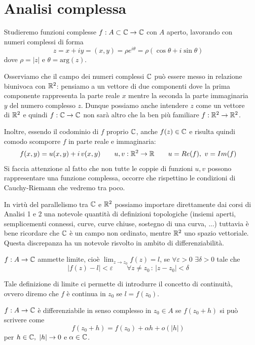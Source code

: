 
\chapter{Analisi complessa}

Studieremo funzioni complesse $f : A\subset\mathbb{C}\rightarrow \mathbb{C}$ con $A$ aperto, lavorando con numeri complessi di forma
\begin{equation*}
z = x + iy = (x, y) = \rho e^{i\theta} = \rho (\cos\theta + i\sin\theta)
\end{equation*}
dove $\rho=|z|$ e $\theta=\text{arg}(z)$.

Osserviamo che il campo dei numeri complessi $\mathbb{C}$ può essere messo in relazione
biunivoca con $\mathbb{R}^2$: pensiamo a un vettore di due componenti dove la prima componente rappresenta la parte
reale $x$ mentre la seconda la parte immaginaria $y$ del numero complesso $z$. Dunque possiamo anche intendere $z$ come un vettore di $\mathbb{R}^2$ e quindi $f:\mathbb{C}\to\mathbb{C}$ non sarà altro che la ben più familiare $f:\mathbb{R}^2\to\mathbb{R}^2$.

Inoltre, essendo il codominio di $f$ proprio $\mathbb{C}$, anche $f(z)\in\mathbb{C}$ e risulta quindi comodo scomporre $f$ in parte reale e immaginaria:
$$
f(x,y)=u(x,y)+i\,v(x,y)\qquad u,v:\mathbb{R}^2\to\mathbb{R} \qquad u=Re(f),\ v=Im(f)
$$
Si faccia attenzione al fatto che non tutte le coppie di funzioni $u,v$ possono rappresentare una funzione
complessa, occorre che rispettino le condizioni di Cauchy-Riemann che vedremo tra poco.

In virtù del parallelismo tra $\mathbb{C}$ e $\mathbb{R}^2$ possiamo importare direttamente dai corsi di Analisi 1 e 2 una notevole quantità di definizioni topologiche (insiemi aperti, semplicementi connessi, curve, curve chiuse, sostegno di una curva, ...) tuttavia è bene ricordare che $\mathbb{C}$ è un campo non ordinato, mentre $\mathbb{R}^2$ uno spazio vettoriale. Questa discrepanza ha un notevole risvolto in ambito di differenziabilità.

\begin{defn}
$f:A\to\mathbb{C}$ ammette limite, cioè $\lim_{z\to z_0}f(z)=l$, se $\forall \varepsilon>0$ $\exists\delta>0$ tale che 
$$|f(z)-l|<\varepsilon \qquad \forall z\neq z_0\,:\,|z-z_0|<\delta$$ 
\end{defn}

Tale definizione di limite ci permette di introdurre il concetto di continuità, ovvero diremo che $f$ è continua in $z_0$ se $l=f(z_0)$.

\begin{defn}
$f:A\to\mathbb{C}$ è differenziabile in senso complesso in $z_0\in A$ se $f(z_0 + h)$ si può scrivere come
\begin{equation*}
f(z_0 + h) = f(z_0) + \alpha h + o(|h|)
\end{equation*}
per $h\in\mathbb{C},\ |h|\rightarrow 0$ e $\alpha\in\mathbb{C}$.
\end{defn}

